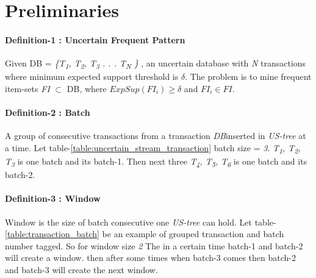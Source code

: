     
\section{Preliminaries}
    \paragraph{Definition-1 : Uncertain Frequent Pattern} 
    Given DB = \emph{\{T\textsubscript{1}, T\textsubscript{2}, T\textsubscript{3} . . . T\textsubscript{N} \}} , an uncertain database with \emph{N} transactions where minimum expected support threshold is $\delta$. The problem is to mine frequent item-sets \emph{FI} $\subset$ DB, where $ExpSup(FI_i) \geq \delta $ and $FI_i \in FI$.
    
    \paragraph{Definition-2 : Batch} 
    A group of consecutive transactions from a transaction \emph{DB}inserted in \emph{US-tree} at a time. Let table-\ref{table:uncertain_stream_transaction} batch size = \emph{3}. \emph{T\textsubscript{1}, T\textsubscript{2}, T\textsubscript{3}} is one batch and its batch-1. Then next three \emph{T\textsubscript{4}, T\textsubscript{5}, T\textsubscript{6}} is one batch and its batch-2.
    
    \paragraph{Definition-3 : Window} Window is the size of batch consecutive one \emph{US-tree} can hold. Let table-\ref{table:transaction_batch} be an example of grouped transaction and batch number tagged. So for window size \emph{2} The in a certain time batch-1 and batch-2 will create a window. then after some times when batch-3 comes then batch-2 and batch-3 will create the next window.
    
